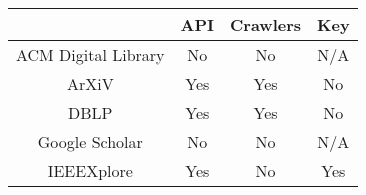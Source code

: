 \documentclass[twocolumn]{article}
\begin{document}
\begin{table}[]
\centering
{}
\\[1\baselineskip]
\begin{tabular}{c|c|c|c|}
\centering
\cline{2-4}
\multicolumn{1}{l|}{}                     & API & Crawlers & Key \\ \hline
\multicolumn{1}{|c|}{ACM Digital Library} & No  & No       & N/A \\ \hline
\multicolumn{1}{|c|}{ArXiV}               & Yes & Yes      & No  \\ \hline
\multicolumn{1}{|c|}{DBLP}                & Yes & Yes      & No  \\ \hline
\multicolumn{1}{|c|}{Google Scholar}      & No  & No       & N/A \\ \hline
\multicolumn{1}{|c|}{IEEEXplore}          & Yes & No       & Yes \\ \hline
\end{tabular}
\end{table}
\end{document}
